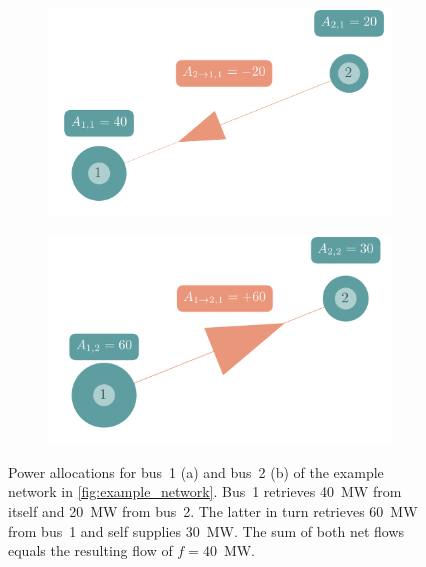 \documentclass[11pt,twocolumn]{article}
\begin{document}
\begin{figure}[h!]
    \begin{subfigure}[c]{\linewidth}
    \includegraphics[width=\linewidth]{example_allocation_bus1.png}
    \vspace{-40pt}
    \subcaption{}
    \label{fig:example_allocation_bus1}
    \end{subfigure}
    \begin{subfigure}[c]{\linewidth}
    \includegraphics[width=\linewidth]{example_allocation_bus2.png}
    \vspace{-40pt}
    \subcaption{}
    \label{fig:example_allocation_bus2}
    \end{subfigure}
    \caption{Power allocations for bus~1 (a) and bus~2 (b) of the example network in \cref{fig:example_network}. Bus~1 retrieves 40~MW from itself and 20~MW from bus~2. The latter in turn retrieves 60~MW from bus~1 and self supplies 30~MW.
    The sum of both net flows equals the resulting flow of $f=40$~MW. \vspace{-20pt}}
    \label{fig:example_allocation}
\end{figure}
\end{document}
